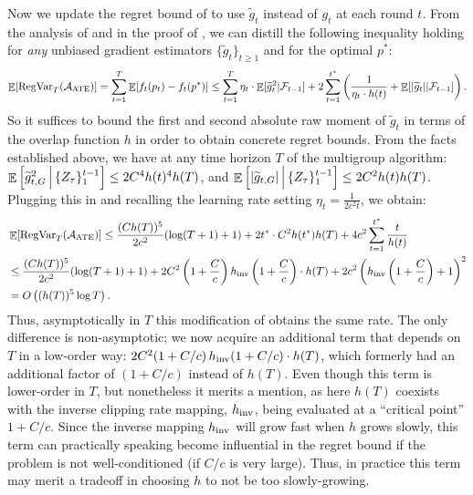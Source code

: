    Now we update the regret bound of \ClipOGDSC to use $\widetilde{g}_t$ instead of $g_t$ at each round $t$.
    From the analysis of  and  in the proof of , we can distill the following inequality holding for \emph{any} unbiased gradient estimators $\{\widetilde{g}_t\}_{t \geq 1}$ and for the optimal $p^*$:
    \[
    \mathop{\mathbb{E}}[\mathrm{RegVar}_T(\mathcal{A}_\mathrm{ATE})] = \sum_{t=1}^T \mathop{\mathbb{E}}[f_t(p_t) - f_t(p^*)] \leq
    \sum_{t=1}^T \eta_t \cdot \mathop{\mathbb{E}}[ \widetilde{g}_t^2 | \mathcal{F}_{t-1}]  + 2 \sum_{t=1}^{t^*} \left(\frac{1}{\eta_t \cdot h(t)} + \mathop{\mathbb{E}}[ |\widetilde{g}_t| | \mathcal{F}_{t-1}] \right).
    \]
    So it suffices to bound the first and second absolute raw moment of $\widetilde{g}_t$ in terms of the overlap function $h$ in order to obtain concrete regret bounds. From the facts established above, we have at any time horizon $T$ of the multigroup algorithm: $\mathop{\mathbb{E}} \left[\widetilde{g}_{t, G}^2 \, \Big|  \, \{Z_{\tau}\}_1^{t-1} \right] \leq 2C^4 h(t)^4 h(T)$, and $\mathop{\mathbb{E}} \left[|\widetilde{g}_{t, G}| \, \Big|  \, \{Z_{\tau}\}_1^{t-1} \right] \leq 2 C^2 h(t) h(T)$. Plugging this in and recalling the learning rate setting $\eta_t = \frac{1}{2 c^2 t}$, we obtain:
    \begin{align*}
        &\mathop{\mathbb{E}}[\mathrm{RegVar}_T(\mathcal{A}_\mathrm{ATE})] \leq \frac{(C h(T))^5}{2c^2} (\log (T+1) + 1)  + 2 t^* \cdot C^2 h(t^*) h(T) + 4c^2 \sum_{t=1}^{t^*} \frac{t}{h(t)} \\
        &\leq \frac{(C h(T))^5}{2c^2} (\log (T+1) + 1) + 2 C^2 \left(1 + \frac{C}{c} \right) h_\mathrm{inv}\left(1+\frac{C}{c}\right) \cdot h(T) + 2c^2 \left(h_\mathrm{inv}\left(1+\frac{C}{c}\right) + 1\right)^2 \\
        &= O \left( (h(T))^5 \log T \right).
    \end{align*}
    Thus, asymptotically in $T$ this modification of \ClipOGDSC obtains the same rate. The only difference is non-asymptotic; we now acquire an additional term that depends on $T$ in a low-order way: $2C^2 (1+C/c) \, h_\mathrm{inv}(1+C/c) \cdot h(T)$, which formerly had an additional factor of $(1+C/c)$ instead of $h(T)$. Even though this term is lower-order in $T$, but nonetheless it merits a mention, as here $h(T)$ coexists with the inverse clipping rate mapping, $h_\mathrm{inv}$, being evaluated at a ``critical point'' $1+C/c$. Since the inverse mapping $h_\mathrm{inv}$ will grow fast when $h$ grows slowly, this term can practically speaking become influential in the regret bound if the problem is not well-conditioned (if $C/c$ is very large). Thus, in practice this term may merit a tradeoff in choosing $h$ to not be too slowly-growing.

